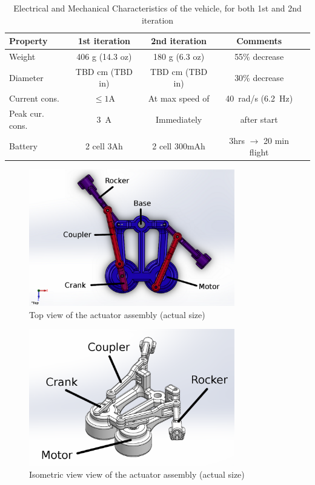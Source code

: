 \begin{appendix}
\begin{table}%
\centering
\renewcommand{\arraystretch}{1.0}
\begin{tabular}{>{\small}l>{\small}cccc}
\hline
Property & 1st iteration & 2nd iteration & Comments\\
\hline
\rowcolor{Gray}
Weight & 406 g (14.3 oz) & 180 g (6.3 oz) & 55\% decrease\\
Diameter & TBD cm (TBD in) & TBD cm (TBD in) & 30\% decrease\\
\rowcolor{Gray}
Current cons.& $\leq1$A & At max speed of& 40~rad/s (6.2~Hz) \\
Peak cur. cons. & 3~A & Immediately & after start \\
\rowcolor{Gray}
Battery & 2 cell 3Ah & 2 cell 300mAh & 3hrs $\rightarrow$ 20 min flight \\
\hline
\end{tabular}
\newline
\caption[Electrical and Mechanical Characteristics of the vehicle]{Electrical and Mechanical Characteristics of the vehicle, for both 1st and 2nd iteration}
\label{tab-vehicle-characteristics}
\end{table}

\begin{figure}
\centering
\includegraphics[width=0.8\textwidth]{Files/Figures/cad_assembly_labeled.png}
\caption{Top view of the actuator assembly (actual size)}
\label{fig:assembly_labels_top}
\end{figure}

\begin{figure}
\centering
\includegraphics[width=0.8\textwidth]{Files/Figures/cad_assembly_iso.png}
\caption{Isometric view view of the actuator assembly (actual size)}
\label{fig:assembly_labels_iso}
\end{figure}


\end{appendix}
